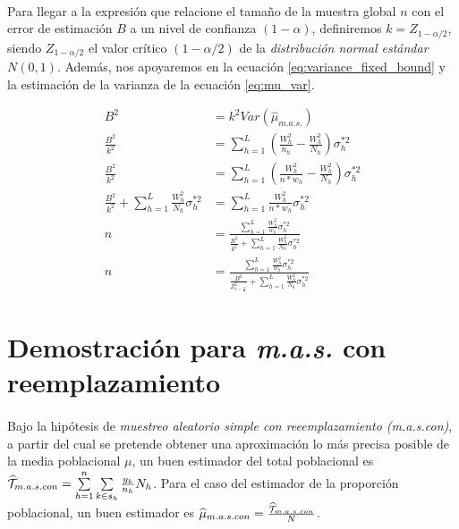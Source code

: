 \documentclass{article}
\begin{document}
    \paragraph{}
    Para llegar a la expresión que relacione el tamaño de la muestra global $n$ con el error de estimación $B$ a un nivel de confianza $(1-\alpha)$, definiremos $k = Z_{1-\alpha/2}$, siendo $Z_{1-\alpha/2 }$ el valor crítico $(1-\alpha/2)$ de la \emph{distribución normal estándar $N(0,1)$}. Además, nos apoyaremos en la ecuación \eqref{eq:variance_fixed_bound} y la estimación de la varianza de la ecuación \eqref{eq:mu_var}.

    \begin{align}
      B^2 &= k^2Var(\widehat{\mu}_{m.a.s.}) \\
      \frac{B^2}{k^2} &= \sum\limits_{h=1}^L\left(\frac{W_h^2}{n_h}- \frac{W_h^2}{N_h}\right)\sigma_h^{*2} \\
      \frac{B^2}{k^2} &= \sum\limits_{h=1}^L\left(\frac{W_h^2}{n*w_h}- \frac{W_h^2}{N_h}\right)\sigma_h^{*2} \\
      \frac{B^2}{k^2} + \sum\limits_{h=1}^L\frac{W_h^2}{N_h}\sigma_h^{*2} &= \sum\limits_{h=1}^L\frac{W_h^2}{n*w_h}\sigma_h^{*2} \\
      n &= \frac{\sum\limits_{h=1}^L\frac{W_h^2}{w_h}\sigma_h^{*2}}{\frac{B^2}{k^2} + \sum\limits_{h=1}^L\frac{W_h^2}{N_h}\sigma_h^{*2}} \\
      n &= \frac{\sum\limits_{h=1}^L\frac{W_h^2}{w_h}\sigma_h^{*2}}{\frac{B^2}{Z_{1-\frac{\alpha}{2}}^2} + \sum\limits_{h=1}^L\frac{W_h^2}{N_h}\sigma_h^{*2}}
    \end{align}

  \section{Demostración para \emph{m.a.s.} con reemplazamiento}

    \paragraph{}
    Bajo la hipótesis de \emph{muestreo aleatorio simple con reeemplazamiento (m.a.s.con)}, a partir del cual se pretende obtener una aproximación lo más precisa posible de la media poblacional $\mu$, un buen estimador del total poblacional es $\widehat{\mathcal{T}}_{m.a.s.con} = \sum\limits_{h=1}^n\sum\limits_{k \in s_h} \frac{y_k}{n_h}N_h$. Para el caso del estimador de la proporción poblacional, un buen estimador es $\widehat{\mu}_{m.a.s.con} = \frac{\widehat{\mathcal{T}}_{m.a.s.con}}{N}$.
\end{document}
